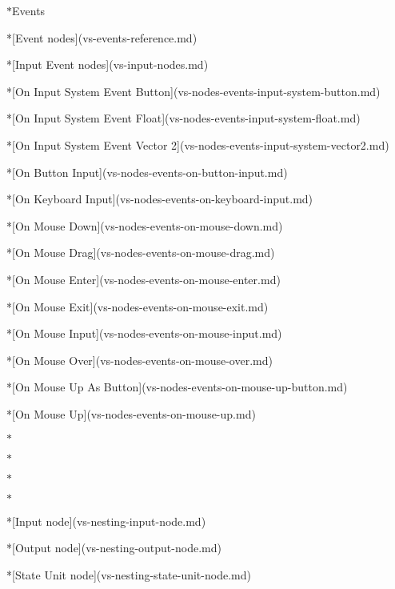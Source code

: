 \begin{DoxyItemize}
\texorpdfstring{$\ast$}{*}\+Events \begin{DoxyVerb}*[Event nodes](vs-events-reference.md)

*[Input Event nodes](vs-input-nodes.md)

    *[On Input System Event Button](vs-nodes-events-input-system-button.md)

    *[On Input System Event Float](vs-nodes-events-input-system-float.md)

    *[On Input System Event Vector 2](vs-nodes-events-input-system-vector2.md)

    *[On Button Input](vs-nodes-events-on-button-input.md)

    *[On Keyboard Input](vs-nodes-events-on-keyboard-input.md)

    *[On Mouse Down](vs-nodes-events-on-mouse-down.md)

    *[On Mouse Drag](vs-nodes-events-on-mouse-drag.md)

    *[On Mouse Enter](vs-nodes-events-on-mouse-enter.md)

    *[On Mouse Exit](vs-nodes-events-on-mouse-exit.md)

    *[On Mouse Input](vs-nodes-events-on-mouse-input.md)

    *[On Mouse Over](vs-nodes-events-on-mouse-over.md)

    *[On Mouse Up As Button](vs-nodes-events-on-mouse-up-button.md)

    *[On Mouse Up](vs-nodes-events-on-mouse-up.md)
\end{DoxyVerb}
 \texorpdfstring{$\ast$}{*}

\texorpdfstring{$\ast$}{*}

\texorpdfstring{$\ast$}{*}

\texorpdfstring{$\ast$}{*} \begin{DoxyVerb}*[Input node](vs-nesting-input-node.md)

*[Output node](vs-nesting-output-node.md)

*[State Unit node](vs-nesting-state-unit-node.md)


\end{DoxyVerb}
\end{DoxyItemize}
